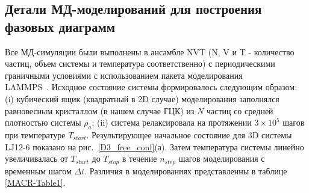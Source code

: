 \subsection{Детали МД-моделирований для построения фазовых диаграмм}
\label{PRIMe-SubSecPhaseDiagramMD}



Все МД-симуляции были выполнены в ансамбле NVT (N, V и T - количество частиц, объем системы и температура соответственно) с периодическими граничными условиями с использованием пакета моделирования \\  LAMMPS~\cite{10.1006/jcph.1995.1039}.
Исходное состояние системы формировалось следующим образом: (i) кубический ящик (квадратный в 2D случае) моделирования заполнялся равновесным кристаллом (в нашем случае ГЦК) из $N$ частиц со средней плотностью системы $\rho_a$; (ii) система релаксировала на протяжении $3 \times 10^5$ шагов при температуре $T_{start}$.
Результирующее начальное состояние для 3D системы LJ12-6 показано на рис.~\ref{D3_free_conf}(а).
Затем температура системы линейно увеличивалась от $T_{start}$ до $T_{stop}$ в течение $n_{step}$ шагов моделирования с временным шагом $\Delta t$. Различия в моделированиях представленны в таблице \ref{MACR-Table1}.


\begin{table}[h!]
    \caption{Параметры, используемые в МД-моделировании для бимодальных расчетов:
    где $\rho$ — средняя плотность системы, $r_c$ — радиус отсечки,
    $T_{start}$ и $T_{stop}$ — начальная и конечная температуры моделирования,
    $n_{step}$ — количество шагов моделирования, а
    $\Delta t$ — временной шаг.}
    \label{MACR-Table1}
\end{table}


